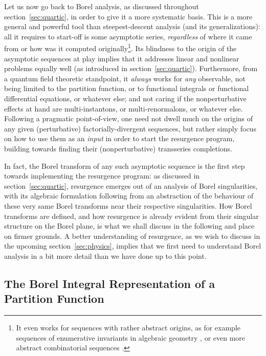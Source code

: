 \documentclass[11pt,a4paper]{article}
\begin{document}
Let us now go back to Borel analysis, as discussed throughout section~\ref{sec:quartic}, in order to give it a more systematic basis. This is a more general and powerful tool than steepest-descent analysis (and its generalizations): all it requires to start-off is some asymptotic series, \textit{regardless} of where it came from or how was it computed originally\footnote{It even works for sequences with rather abstract origins, as for example sequences of enumerative invariants in algebraic geometry \cite{csv16}, or even more abstract combinatorial sequences \cite{m_b16}.}. Its blindness to the origin of the asymptotic sequences at play implies that it addresses linear and nonlinear problems equally well (as introduced in section~\ref{sec:quartic}). Furthermore, from a quantum field theoretic standpoint, it \textit{always} works for \textit{any} observable, not being limited to the partition function, or to functional integrals or functional differential equations, or whatever else; and not caring if the nonperturbative effects at hand are multi-instantons, or multi-renormalons, or whatever else. Following a pragmatic point-of-view, one need not dwell much on the origins of any given (perturbative) factorially-divergent sequences, but rather simply focus on how to use them as an \textit{input} in order to start the resurgence program, building towards finding their (nonperturbative) transseries completions.

In fact, the Borel transform of any such asymptotic sequence is the first step towards implementing the resurgence program: as discussed in section~\ref{sec:quartic}, resurgence emerges out of an analysis of Borel singularities, with its algebraic formulation following from an abstraction of the behaviour of these very same Borel transforms near their respective singularities. How Borel transforms are defined, and how resurgence is already evident from their singular structure on the Borel plane, is what we shall discuss in the following and place on firmer grounds. A better understanding of resurgence, as we wish to discuss in the upcoming section~\ref{sec:physics}, implies that we first need to understand Borel analysis in a bit more detail than we have done up to this point.

\subsection*{The Borel Integral Representation of a Partition Function}
\end{document}

